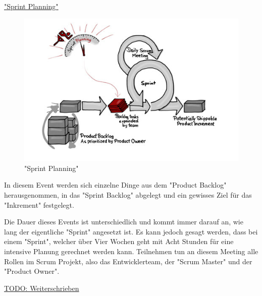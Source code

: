 \cite{Scrum}

\underline{"Sprint Planning"}

\begin{figure}[H]
    \centering
    \includegraphics[width=\textwidth]{media/ProjectManagement/SprintPlanning.jpg}
    \caption{"Sprint Planning" \cite{PlanningBild}}
\end{figure}

In diesem Event werden sich einzelne Dinge aus dem "Product Backlog" herausgenommen, in das "Sprint Backlog" abgelegt und ein gewisses Ziel für das "Inkrement" festgelegt.

Die Dauer dieses Events ist unterschiedlich und kommt immer darauf an, wie lang der eigentliche "Sprint" angesetzt ist. Es kann jedoch gesagt werden, dass bei einem "Sprint", welcher über Vier Wochen geht mit Acht Stunden für eine intensive Planung gerechnet werden kann. Teilnehmen tun an diesem Meeting alle Rollen im Scrum Projekt, also das Entwicklerteam, der "Scrum Master" und der "Product Owner". \cite{Planning}

\underline{TODO: Weiterschrieben}

